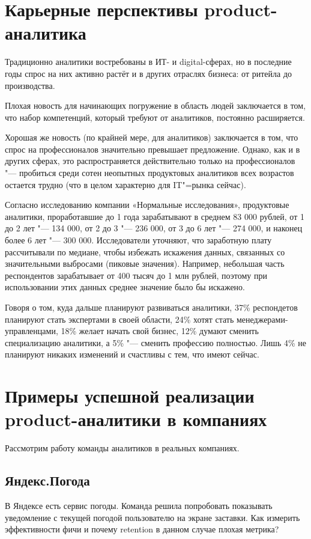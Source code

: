 \documentclass[referat, times]{SCWorks}
\begin{document}
\section{Карьерные перспективы product-аналитика}
Традиционно аналитики востребованы в ИТ- и digital-сферах, но в последние годы спрос на них активно растёт и в других отраслях бизнеса: от ритейла до производства.

Плохая новость для начинающих погружение в область людей заключается в том, что набор компетенций, который требуют от аналитиков, постоянно расширяется.

Хорошая же новость (по крайней мере, для аналитиков) заключается в том, что спрос на профессионалов значительно превышает предложение. Однако, как и в других сферах, это распространяется действительно только на профессионалов "--- пробиться среди сотен неопытных продуктовых аналитиков всех возрастов остается трудно (что в целом характерно для IT"=рынка сейчас).

Согласно исследованию компании «Нормальные исследования», продуктовые аналитики, проработавшие до 1 года зарабатывают в среднем 83 000 рублей, от 1 до 2 лет "--- 134 000, от 2 до 3 "--- 236 000, от 3 до 6 лет "--- 274 000, и наконец более 6 лет "--- 300 000. Исследователи уточняют, что заработную плату рассчитывали по медиане, чтобы избежать искажения данных, связанных со значительными выбросами (пиковые значения). Например, небольшая часть респондентов зарабатывает от 400 тысяч до 1 млн рублей, поэтому при использовании этих данных среднее значение было бы искажено\cite{research}.

Говоря о том, куда дальше планируют развиваться аналитики, 37\% респондетов планируют стать экспертами в своей области, 24\% хотят стать менеджерами-управленцами, 18\% желает начать свой бизнес, 12\% думают сменить специализацию аналитики, а 5\% "--- сменить профессию полностью. Лишь 4\% не планируют никаких изменений и счастливы с тем, что имеют сейчас.

\section{Примеры успешной реализации product-аналитики в компаниях}
Рассмотрим работу команды аналитиков в реальных компаниях.
\subsection{Яндекс.Погода}
В Яндексе есть сервис погоды. Команда решила попробовать показывать уведомление с текущей погодой пользователю на экране заставки. Как измерить эффективности фичи и почему retention в данном случае плохая метрика?
\end{document}
